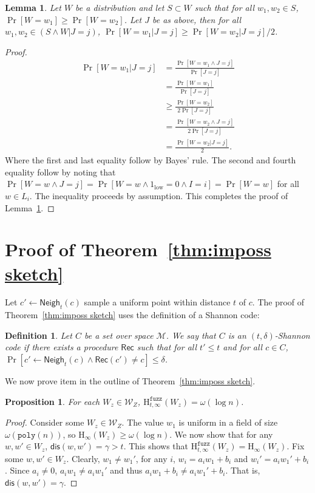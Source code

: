 \documentclass[11pt]{article}
\newtheorem{lemma}[theorem]{Lemma}
\newtheorem{proposition}[theorem]{Proposition}
\newtheorem{definition}[theorem]{Definition}
\newcommand{\thref}[1]{\mbox{Theorem~\ref{#1}}}
\newcommand{\lemref}[1]{\mbox{Lemma~\ref{#1}}}
\newcommand{\class}[1]{{\ensuremath{\mathsf{#1}}}}
\newcommand{\rec}{\ensuremath{\class{Rec}}\xspace}
\newcommand{\neigh}{\ensuremath{\class{Neigh}}\xspace}
\newcommand{\dis}{\ensuremath{\mathsf{dis}}}
\newcommand{\poly}{\ensuremath{\mathtt{poly}}\xspace}
\newcommand{\Hoo}{\mathrm{H}_\infty}
\newcommand{\Hfuzz}{\mathrm{H}^{\mathtt{fuzz}}_{t,\infty}}
\begin{document}
\begin{lemma}
\label{lem:nearly flat after conditioning}
Let $W$ be a distribution and let $S\subset W$ such that for all $w_1, w_2 \in S$, $\Pr[W=w_1]\ge \Pr[W=w_2]$.  Let $J$ be as above, then for all $w_1, w_2 \in (S \wedge W|J=j )$, $\Pr[W=w_1 | J=j]\ge \Pr[W=w_2 | J=j]/2$.
\end{lemma}
\begin{proof}
\begin{align*}
\Pr[W=w_1 | J=j] &=\frac{\Pr[W=w_1\wedge J=j] }{\Pr[J=j]}\\
&= \frac{\Pr[W=w_1]}{\Pr[J=j]}\\
&\ge \frac{\Pr[W=w_2]}{2 \Pr[J=j]}\\
&= \frac{\Pr[W=w_2 \wedge J=j]}{2\Pr[J=j]}\\
&=\frac{\Pr[W=w_2 | J=j]}{2}.
\end{align*}
Where the first and last equality follow by Bayes' rule.  The second and fourth equality follow by noting that $\Pr[W=w \wedge J=j] = \Pr[W=w \wedge 1_{\text{low}}=0 \wedge I=i] = \Pr[W=w]$ for all $w\in L_i$.  The inequality proceeds by assumption.  This completes the proof of \lemref{lem:nearly flat after conditioning}.
\end{proof}

\section{Proof of \thref{thm:imposs sketch}}
\label{sec:proof secure sketch imposs}
Let $c'\leftarrow \neigh_t(c)$ sample a uniform point within distance $t$ of $c$.  
The proof of \thref{thm:imposs sketch} uses the definition of a Shannon code: 
\begin{definition}
\label{def:shannon-code}
Let $C$ be a set over space $\mathcal{M}$.  We say that $C$ is an $(t,\delta)$-\emph{Shannon code} if there exists a procedure $\rec$ such that for all $t'\le t$ and for all $c\in C$, $\Pr[c'\leftarrow \neigh_t(c) \wedge \rec(c') \neq c]\le \delta$. %
\end{definition}

\noindent
We now prove item in the outline of \thref{thm:imposs sketch}.

\begin{proposition} 
\label{prop:each element good} For each $W_z\in\mathcal{W}_Z$, $\Hfuzz(W_z) = \omega(\log n)$.
\end{proposition}
\begin{proof}
Consider some $W_z\in\mathcal{W}_Z$.  The value $w_1$ is uniform in a field of size $\omega(\poly(n))$, so $\Hoo(W_z) \ge \omega(\log n)$.  We now show that for any $w, w'\in W_z$, $\dis(w, w') = \gamma>t$.  This shows that $\Hfuzz(W_z) = \Hoo(W_z)$.  Fix some $w, w'\in W_z$.  Clearly, $w_1 \neq w_1'$, for any $i$, $w_i = a_i w_1 + b_i$ and $w_i' = a_i w_1' + b_i$.  Since $a_i\neq 0$, $a_iw_1 \neq a_iw_1'$ and thus $a_iw_1+b_i \neq a_iw_1'+b_i$.  That is, $\dis (w, w')  =\gamma$.
\end{proof}
\end{document}
